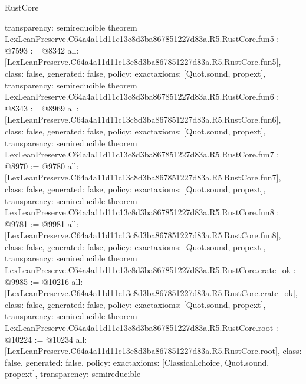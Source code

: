 \begin{lexlean}{RustCore}
\begin{coremodule}
{  transparency: semireducible
}
theorem LexLeanPreserve.C64a4a11d11c13c8d3ba867851227d83a.R5.RustCore.fun5 : @7593 := @8342 {
  all: [LexLeanPreserve.C64a4a11d11c13c8d3ba867851227d83a.R5.RustCore.fun5],
  class: false,
  generated: false,
  policy: exact{axioms: [Quot.sound, propext]},
  transparency: semireducible
}
theorem LexLeanPreserve.C64a4a11d11c13c8d3ba867851227d83a.R5.RustCore.fun6 : @8343 := @8969 {
  all: [LexLeanPreserve.C64a4a11d11c13c8d3ba867851227d83a.R5.RustCore.fun6],
  class: false,
  generated: false,
  policy: exact{axioms: [Quot.sound, propext]},
  transparency: semireducible
}
theorem LexLeanPreserve.C64a4a11d11c13c8d3ba867851227d83a.R5.RustCore.fun7 : @8970 := @9780 {
  all: [LexLeanPreserve.C64a4a11d11c13c8d3ba867851227d83a.R5.RustCore.fun7],
  class: false,
  generated: false,
  policy: exact{axioms: [Quot.sound, propext]},
  transparency: semireducible
}
theorem LexLeanPreserve.C64a4a11d11c13c8d3ba867851227d83a.R5.RustCore.fun8 : @9781 := @9981 {
  all: [LexLeanPreserve.C64a4a11d11c13c8d3ba867851227d83a.R5.RustCore.fun8],
  class: false,
  generated: false,
  policy: exact{axioms: [Quot.sound, propext]},
  transparency: semireducible
}
theorem LexLeanPreserve.C64a4a11d11c13c8d3ba867851227d83a.R5.RustCore.crate_ok : @9985 := @10216 {
  all: [LexLeanPreserve.C64a4a11d11c13c8d3ba867851227d83a.R5.RustCore.crate_ok],
  class: false,
  generated: false,
  policy: exact{axioms: [Quot.sound, propext]},
  transparency: semireducible
}
theorem LexLeanPreserve.C64a4a11d11c13c8d3ba867851227d83a.R5.RustCore.root : @10224 := @10234 {
  all: [LexLeanPreserve.C64a4a11d11c13c8d3ba867851227d83a.R5.RustCore.root],
  class: false,
  generated: false,
  policy: exact{axioms: [Classical.choice, Quot.sound, propext]},
  transparency: semireducible
}


\end{coremodule}
\end{lexlean}
